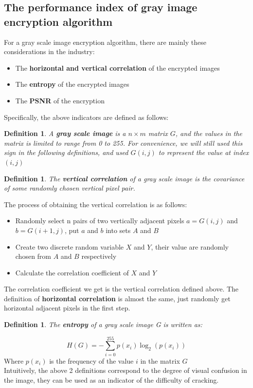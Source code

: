 \documentclass[11pt]{article}
\newtheorem{definition}[theorem]{Definition}
\begin{document}
\subsection{The performance index of gray image encryption algorithm}
For a gray scale image encryption algorithm, there are mainly these considerations in the industry:
\begin{itemize}
\item The \textbf{horizontal and vertical correlation} of the encrypted images
\item The \textbf{entropy} of the encrypted images
\item The \textbf{PSNR} of the encryption
\end{itemize}
Specifically, the above indicators are defined as follows:
\begin{definition}
A \textbf{gray scale image} is a $n \times m$ matrix $G$, and the values in the matrix is limited to range from 0 to 255. For convenience, we will still used this sign in the following definitions, and used $G(i, j)$ to represent the value at index $(i, j)$
\end{definition}
\begin{definition}
The \textbf{vertical correlation} of a gray scale image is the covariance of some randomly chosen vertical pixel pair.
\end{definition}
The process of obtaining the vertical correlation is as follows:
\begin{itemize}
\item Randomly select n pairs of two vertically adjacent pixels $a = G(i, j)$ and $b = G(i+1, j)$, put $a$ and $b$ into sets $A$ and $B$
\item Create two discrete random variable $X$ and $Y$, their value are randomly chosen from $A$ and $B$ respectively
\item Calculate the correlation coefficient of $X$ and $Y$
\end{itemize}
The correlation coefficient we get is the vertical correlation defined above.  The definition of \textbf{horizontal correlation} is almost the same, just randomly get horizontal adjacent pixels in the first step.

\begin{definition}
The \textbf{entropy} of a gray scale image G is written as:
\end{definition}

$$
H(G)=-\sum_{i=0}^{255}p(x_i)\log_2(p(x_i))
$$
Where $p(x_i)$ is the frequency of the value $i$ in the matrix $G$\\
Intuitively, the above 2 definitions correspond to the degree of visual confusion in the image, they can be used as an indicator of the difficulty of cracking.
\end{document}

